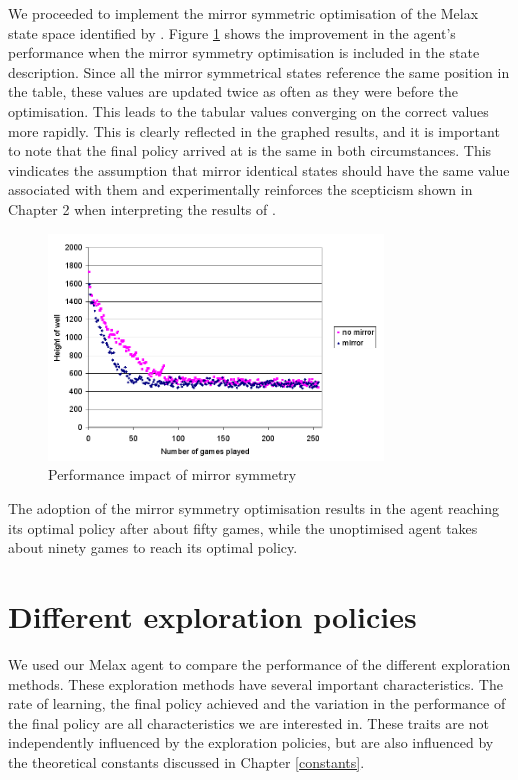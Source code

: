 \documentclass{rucsthesis}
\begin{document}
We proceeded to implement the mirror symmetric optimisation of the Melax state space identified by \cite{yaeltetris}. Figure \ref{fig:comparemelax} shows the improvement in the agent's performance when the mirror symmetry optimisation is included in the state description. Since all the mirror symmetrical states reference the same position in the table, these values are updated twice as often as they were before the optimisation. This leads to the tabular values converging on the correct values more rapidly. This is clearly reflected in the graphed results, and it is important to note that the final policy arrived at is the same in both circumstances. This vindicates the assumption that mirror identical states should have the same value associated with them and experimentally reinforces the scepticism shown in Chapter 2 when interpreting the results of \cite{yaeltetris}. 

\begin{figure}[h]
\centering
\includegraphics[width=3.5in]{mirrormelax.png}
\caption{Performance impact of mirror symmetry}
\label{fig:comparemelax}
\end{figure}

The adoption of the mirror symmetry optimisation results in the agent reaching its optimal policy after about fifty games, while the unoptimised agent takes about ninety games to reach its optimal policy.

\section{Different exploration policies}

We used our Melax agent to compare the performance of the different exploration methods. These exploration methods have several important characteristics. The rate of learning, the final policy achieved and the variation in the performance of the final policy are all characteristics we are interested in. These traits are not independently influenced by the exploration policies, but are also influenced by the theoretical constants discussed in Chapter \ref{constants}. 
\end{document}
